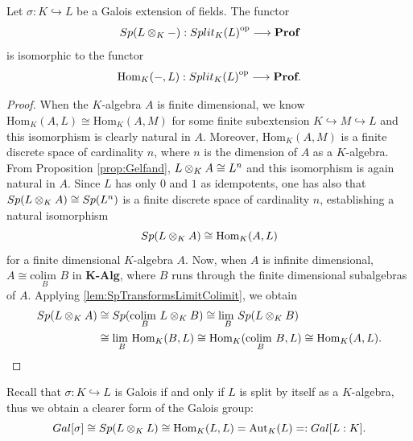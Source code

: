 \begin{proposition}
\label{prop:SP=HOM}
    Let $\sigma: K\hookrightarrow L$ be a Galois extension of fields. The functor
    \[ Sp(L\otimes_{K}-):{Split_K(L)}^{\mathrm{op}}\longrightarrow \textbf{Prof} \]
    is isomorphic to the functor
    \[ \text{Hom}_K(-,L):{Split_K(L)}^{\mathrm{op}}\longrightarrow \textbf{Prof}. \]
    \begin{proof}
        When the $K$-algebra $A$ is finite dimensional, we know $\text{Hom}_K(A,L)\cong \text{Hom}_K(A,M)$ for some finite subextension $K\hookrightarrow M\hookrightarrow L$ and this isomorphism is clearly natural in $A$. Moreover, $\text{Hom}_K(A,M)$ is a finite discrete space of cardinality $n$, where $n$ is the dimension of $A$ as a $K$-algebra. From Proposition \ref{prop:Gelfand}, $L\otimes_{K}A\cong L^n$ and this isomorphism is again natural in $A$. Since $L$ has only $0$ and $1$ as idempotents, one has also that $Sp(L\otimes_{K}A)\cong Sp(L^n)$ is a finite discrete space of cardinality $n$, establishing a natural isomorphism
        \[ Sp(L\otimes_{K}A)\cong \text{Hom}_K(A,L) \]
        for a finite dimensional $K$-algebra $A$.
        Now, when $A$ is infinite dimensional, $A\cong\underset{B}{\text{colim }}B$ in \textbf{K-Alg}, where $B$ runs through the finite dimensional subalgebras of $A$. Applying \ref{lem:SpTransformsLimitColimit}, we obtain
        \begin{align*}
            Sp(L\otimes_{K}A) &\cong Sp(\underset{B}{\text{colim }}L\otimes_{K}B) \cong \underset{B}{\text{lim }}Sp(L\otimes_{K}B) \\
            & \cong  \underset{B}{\text{lim }}\text{Hom}_K(B,L) \cong\text{Hom}_K(\underset{B}{\text{colim }}B,L) \cong \text{Hom}_K(A,L).
        \end{align*}
    \end{proof}
\end{proposition}

Recall that $\sigma:K\hookrightarrow L$ is Galois if and only if $L$ is split by itself as a $K$-algebra, thus we obtain a clearer form of the Galois group:
\[ Gal[\sigma]\cong Sp(L\otimes_{K}L)\cong \text{Hom}_K(L,L) = \text{Aut}_K(L)=:Gal[L:K]. \]

